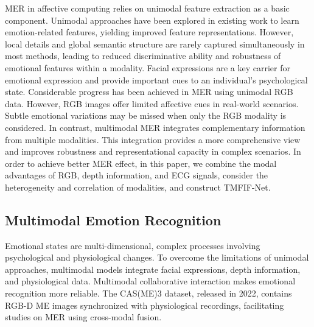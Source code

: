 \documentclass[lettersize,journal]{IEEEtran}
\begin{document}
MER in affective computing relies on unimodal feature extraction as a basic component. Unimodal approaches have been explored in existing work to learn emotion-related features, yielding improved feature representations. However, local details and global semantic structure are rarely captured simultaneously in most methods, leading to reduced discriminative ability and robustness of emotional features within a modality. Facial expressions are a key carrier for emotional expression and provide important cues to an individual’s psychological state. Considerable progress has been achieved in MER using unimodal RGB data. However, RGB images offer limited affective cues in real-world scenarios. Subtle emotional variations may be missed when only the RGB modality is considered. In contrast, multimodal MER integrates complementary information from multiple modalities. This integration provides a more comprehensive view and improves robustness and representational capacity in complex scenarios. In order to achieve better MER effect, in this paper, we combine the modal advantages of RGB, depth information, and ECG signals, consider the heterogeneity and correlation of modalities, and construct TMFIF-Net.

\subsection{Multimodal Emotion Recognition}

Emotional states are multi-dimensional, complex processes involving psychological and physiological changes. To overcome the limitations of unimodal approaches, multimodal models integrate facial expressions, depth information, and physiological data. Multimodal collaborative interaction makes emotional recognition more reliable. The CAS(ME)3 \cite{24} dataset, released in 2022, contains RGB-D ME images synchronized with physiological recordings, facilitating studies on MER using cross-modal fusion.
\end{document}
